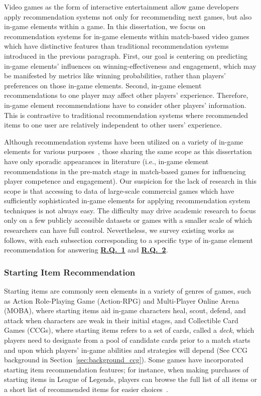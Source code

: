 Video games as the form of interactive entertainment allow game developers apply recommendation systems not only for recommending next games, but also in-game elements within a game. In this dissertation, we focus on recommendation systems for in-game elements within match-based video games which have distinctive features than traditional recommendation systems introduced in the previous paragraph. First, our goal is centering on predicting in-game elements' influences on winning-effectiveness and engagement, which may be manifested by metrics like winning probabilities, rather than players' preferences on those in-game elements. Second, in-game element recommendations to one player may affect other players' experience. Therefore, in-game element recommendations have to consider other players' information. This is contrastive to traditional recommendation systems where recommended items to one user are relatively independent to other users' experience.

Although recommendation systems have been utilized on a variety of in-game elements for various purposes~\cite{kolen2018horizontal,wu2017recommendation}, those sharing the same scope as this dissertation have only sporadic appearances in literature (i.e., in-game element recommendations in the pre-match stage in match-based games for influencing player competence and engagement). 
Our suspicion for the lack of research in this scope is that accessing to data of large-scale commercial games which have sufficiently sophisticated in-game elements for applying recommendation system techniques is not always easy. The difficulty may drive academic research to focus only on a few publicly accessible datasets or games with a smaller scale of which researchers can have full control. Nevertheless, we survey existing works as follows, with each subsection corresponding to a specific type of in-game element recommendation for answering  \hyperref[rq1]{\textbf{R.Q.~1}} and  \hyperref[rq2]{\textbf{R.Q.~2}}.


\subsubsection{Starting Item Recommendation}\label{sec:rw_startitem}
Starting items are commonly seen elements in a variety of genres of games, such as Action Role-Playing Game (Action-RPG) and Multi-Player Online Arena (MOBA), where starting items aid in-game characters heal, scout, defend, and attack when characters are weak in their initial stages, and Collectible Card Games (CCGs), where starting items refers to a set of cards, called a \textit{deck}, which players need to designate from a pool of candidate cards prior to a match starts and upon which players' in-game abilities and strategies will depend (See CCG background in  Section~\ref{sec:background_ccg}). Some games have incorporated starting item recommendation features; for instance, when making purchases of starting items in League of Legends, players can browse the full list of all items or a short list of recommended items for easier choices~\cite{lol_recomitem}. 

